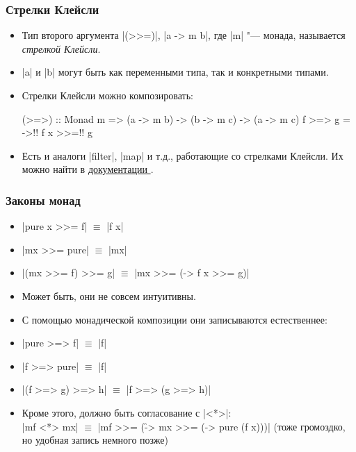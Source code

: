 \documentclass[11pt]{beamer}
\begin{document}
\begin{frame}[fragile]
  \frametitle{Стрелки Клейсли}
  \begin{itemize}
    \item Тип второго аргумента \haskinline|(>>=)|, \haskinline|a -> m b|, где \haskinline|m| "--- монада, называется \emph{стрелкой Клейсли}.
    \item \haskinline|a| и \haskinline|b| могут быть как переменными типа, так и конкретными типами.
    \item Стрелки Клейсли можно композировать:
          \begin{haskellsmall}
            (>=>) :: Monad m => (a -> m b) -> (b -> m c) ->
                                (a -> m c)
            f >=> g = \x ->!\pause! f x >>=!\pause! g
          \end{haskellsmall}
    \item Есть и аналоги \haskinline|filter|, \haskinline|map| и т.д., работающие со стрелками Клейсли. Их можно найти в \href{https://hackage.haskell.org/package/base-4.18.0.0/docs/Control-Monad.html}{документации }.
  \end{itemize}
\end{frame}

\begin{frame}[fragile]
  \frametitle{Законы монад}
  \begin{itemize}
    \item \haskinline|pure x >>= f| $\equiv$ \haskinline|f x|
    \item \haskinline|mx >>= pure| $\equiv$ \haskinline|mx|
    \item \haskinline|(mx >>= f) >>= g| $\equiv$ \haskinline|mx >>= (\x -> f x >>= g)|
    \item Может быть, они не совсем интуитивны.
          \pause
    \item С помощью монадической композиции они записываются естественнее:
    \item \haskinline|pure >=> f| $\equiv$ \haskinline|f|
    \item \haskinline|f >=> pure| $\equiv$ \haskinline|f|
    \item \haskinline|(f >=> g) >=> h| $\equiv$ \haskinline|f >=> (g >=> h)| \pause
    \item Кроме этого, должно быть согласование с \haskinline|<*>|: \\
          \haskinline|mf <*> mx| $\equiv$ \haskinline|mf >>= (\f -> mx >>= (\x -> pure (f x)))|
          (тоже громоздко, но удобная запись немного позже)
  \end{itemize}
\end{frame}
\end{document}

